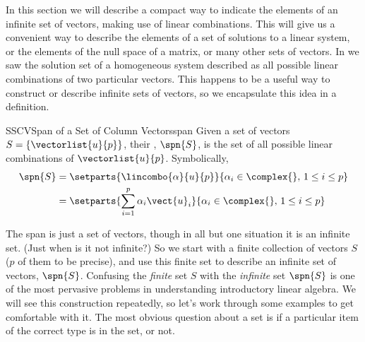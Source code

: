 %
In this section we will describe a compact way to indicate the elements of an infinite set of vectors, making use of linear combinations.  This will give us a convenient way to describe the elements of a set of solutions to a linear system, or the elements of the null space of a matrix, or many other sets of vectors.
%
%
In  we saw the solution set of a homogeneous system described as all possible linear combinations of two particular vectors.  This happens to be a useful way to construct or describe infinite sets of vectors, so we encapsulate this idea in a definition.
%
%
\begin{definition}{SSCV}{Span of a Set of Column Vectors}{span}
Given a set of vectors $S=\{\vectorlist{u}{p}\}$, their , $\spn{S}$, is the set of all possible linear combinations of $\vectorlist{u}{p}$.  Symbolically,
%
\begin{align*}
\spn{S}&=\setparts{\lincombo{\alpha}{u}{p}}{\alpha_i\in\complex{\null},\,1\leq i\leq p}\\
&=\setparts{\sum_{i=1}^{p}\alpha_i\vect{u}_i}{\alpha_i\in\complex{\null},\,1\leq i\leq p}
\end{align*}
%
\end{definition}
%
The span is just a set of vectors, though in all but one situation it is an infinite set.  (Just when is it not infinite?)  So we start with a finite collection of vectors $S$ ($p$ of them to be precise), and use this finite set to describe an infinite set of vectors, $\spn{S}$.  Confusing the {\em finite} set $S$ with the {\em infinite} set $\spn{S}$ is one of the most pervasive problems in understanding introductory linear algebra.  We will see this construction repeatedly, so let's work through some examples to get comfortable with it.  The most obvious question about a set is if a particular item of the correct type is in the set, or not.
%
%
